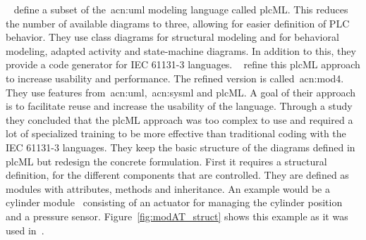 \citeauthor{WITSCH2015}~\cite{WITSCH2015, WITSCH20117866} define a subset of the~\acrshort{acn:uml} modeling language called plcML.
This reduces the number of available diagrams to three, allowing for easier definition of PLC behavior.
They use class diagrams for structural modeling and for behavioral modeling, adapted activity and state-machine diagrams.
In addition to this, they provide a code generator for IEC 61131-3 languages.
\citeauthor{Obermeier:2015aa}~\cite{Obermeier:2015aa} refine this plcML approach to increase usability and performance.
The refined version is called~\acrfull{acn:mod4}.
They use features from~\acrshort{acn:uml},~\acrshort{acn:sysml} and plcML.
A goal of their approach is to facilitate reuse and increase the usability of the language.
Through a study~\cite{6315074} they concluded that the plcML approach was too complex to use and required a lot of specialized training to be more effective than traditional coding with the IEC 61131-3 languages.
They keep the basic structure of the diagrams defined in plcML but redesign the concrete formulation.
First it requires a structural definition, for the different components that are controlled.
They are defined as modules with attributes, methods and inheritance.
An example would be a cylinder module~\cite{Obermeier:2015aa} consisting of an actuator for managing the cylinder position and a pressure sensor.
Figure~\ref{fig:modAT_struct} shows this example as it was used in~\cite{Obermeier:2015aa}.
